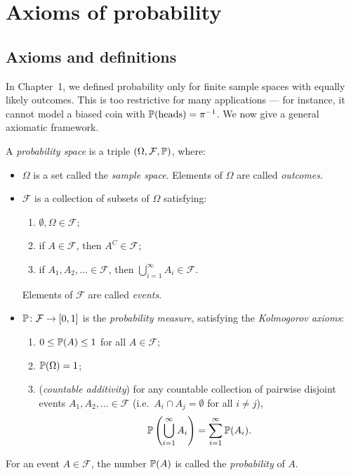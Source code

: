 \documentclass[a4paper]{article}
\begin{document}
\section{Axioms of probability}
\label{sec:axioms}
\subsection{Axioms and definitions}

\begin{remark}
  In Chapter~1, we defined probability only for finite sample spaces with equally likely outcomes. This is too restrictive for many applications --- for instance, it cannot model a biased coin with $\P(\text{heads}) = \pi^{-1}$. We now give a general axiomatic framework.
\end{remark}

\begin{defi}
  A \emph{probability space} is a triple $(\Omega, \mathcal{F}, \P)$, where:
  \begin{itemize}
    \item $\Omega$ is a set called the \emph{sample space}. Elements of $\Omega$ are called \emph{outcomes}.
    \item $\mathcal{F}$ is a collection of subsets of $\Omega$ satisfying:
    \begin{enumerate}
      \item $\emptyset, \Omega\in \mathcal{F}$;
      \item if $A\in \mathcal{F}$, then $A^C\in \mathcal{F}$;
      \item if $A_1, A_2, \dotsc \in \mathcal{F}$, then $\bigcup_{i = 1}^\infty A_i \in \mathcal{F}$.
    \end{enumerate}
    Elements of $\mathcal{F}$ are called \emph{events}.
    \item $\P\colon \mathcal{F}\to [0, 1]$ is the \emph{probability measure}, satisfying the \emph{Kolmogorov axioms}:
    \begin{enumerate}
      \item $0 \leq \P(A) \leq 1$ for all $A\in \mathcal{F}$;
      \item $\P(\Omega) = 1$;
      \item (\emph{countable additivity}) for any countable collection of pairwise disjoint events $A_1, A_2, \dotsc \in \mathcal{F}$ (i.e.\ $A_i\cap A_j = \emptyset$ for all $i \neq j$),
      \[
        \P\left(\bigcup_{i=1}^{\infty} A_i\right) = \sum_{i=1}^{\infty} \P(A_i).
      \]
    \end{enumerate}
  \end{itemize}
  For an event $A \in \mathcal{F}$, the number $\P(A)$ is called the \emph{probability} of $A$.
\end{defi}
\end{document}
